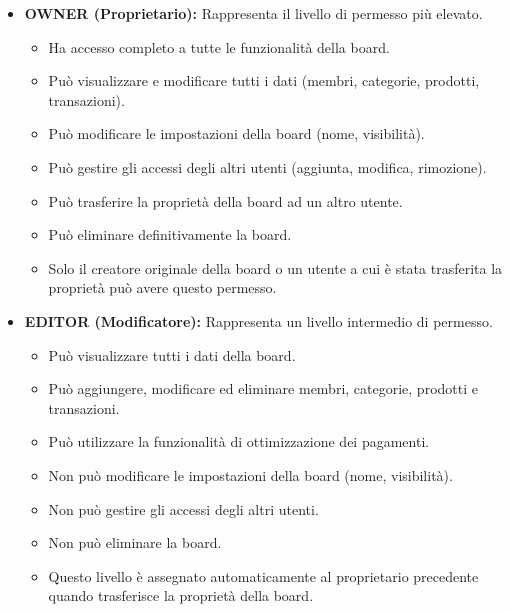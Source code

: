 \documentclass[11pt]{article}
\begin{document}
\begin{itemize}
    \item \textbf{OWNER (Proprietario):} Rappresenta il livello di permesso più elevato.
    \begin{itemize}
        \item Ha accesso completo a tutte le funzionalità della board.
        \item Può visualizzare e modificare tutti i dati (membri, categorie, prodotti, transazioni).
        \item Può modificare le impostazioni della board (nome, visibilità).
        \item Può gestire gli accessi degli altri utenti (aggiunta, modifica, rimozione).
        \item Può trasferire la proprietà della board ad un altro utente.
        \item Può eliminare definitivamente la board.
        \item Solo il creatore originale della board o un utente a cui è stata trasferita la proprietà può avere questo permesso.
    \end{itemize}

    \item \textbf{EDITOR (Modificatore):} Rappresenta un livello intermedio di permesso.
    \begin{itemize}
        \item Può visualizzare tutti i dati della board.
        \item Può aggiungere, modificare ed eliminare membri, categorie, prodotti e transazioni.
        \item Può utilizzare la funzionalità di ottimizzazione dei pagamenti.
        \item Non può modificare le impostazioni della board (nome, visibilità).
        \item Non può gestire gli accessi degli altri utenti.
        \item Non può eliminare la board.
        \item Questo livello è assegnato automaticamente al proprietario precedente quando trasferisce la proprietà della board.
    \end{itemize}


\end{itemize}
\end{document}
